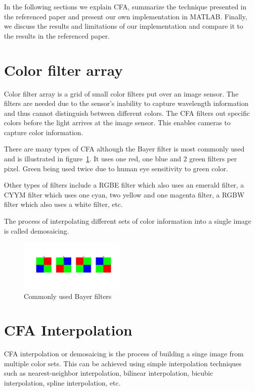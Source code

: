 \documentclass{template/acm_proc_article-sp}
\begin{document}
In the following sections we explain CFA, summarize the technique presented 
in the referenced paper and present our own implementation in MATLAB.
Finally, we discuss the results and limitations of our implementation and compare it
to the results in the referenced paper.

\section{Color filter array}
Color filter array is a grid of small color 
filters put over an image sensor.
The filters are needed due to the sensor's inability to capture wavelength 
information and thus cannot distinguish between different colors.
The CFA filters out specific colors before the light arrives at the image sensor.
This enables cameras to capture color information.

There are many types of CFA although the Bayer filter is most commonly used and is 
illustrated in figure~\ref{img_4_bayer_filters}.
It uses one red, one blue and 2 green filters per pixel. 
Green being used twice due to human eye sensitivity to green color.

Other types of filters include a RGBE filter which also uses an emerald filter, a CYYM
filter which uses one cyan, two yellow and one magenta filter, a RGBW filter which also uses a white filter, etc.

The process of interpolating different sets of color information into a single image 
is called demosaicing.

\begin{figure}[H]
\centering
\includegraphics[trim=175 200 100 205,clip,width=0.46\textwidth]{report/results/4_bayer_filters.jpg}
\caption{Commonly used Bayer filters}
\label{img_4_bayer_filters}
\end{figure}

\section{CFA Interpolation}
CFA interpolation or demosaicing \cite{cfainterpolation2009,gunturk2005demosaicking} is the process of building a singe image from
multiple color sets. 
This can be achieved using simple interpolation techniques such as 
nearest-neighbor interpolation, bilinear interpolation, 
bicubic interpolation, spline interpolation, etc.
\end{document}
